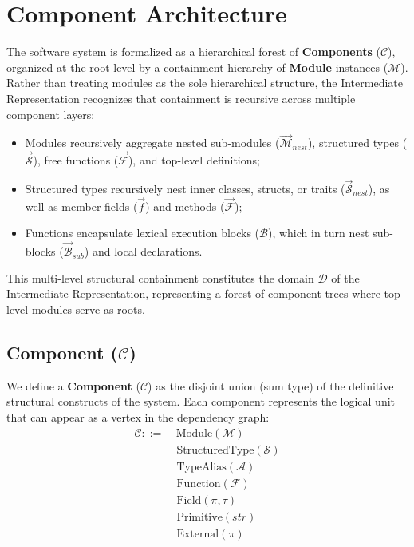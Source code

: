 \section{Component Architecture}
The software system is formalized as a hierarchical forest of
\textbf{Components} ($\mathcal{C}$), organized at the root level by a
containment hierarchy of \textbf{Module} instances ($\mathcal{M}$).
Rather than treating modules as the sole hierarchical structure, the
Intermediate Representation recognizes that containment is recursive
across multiple component layers:
\begin{itemize}
  \item Modules recursively aggregate nested sub-modules
    ($\vec{\mathcal{M}}_{nest}$),
    structured types ($\vec{\mathcal{S}}$), free functions
    ($\vec{\mathcal{F}}$),
    and top-level definitions;
  \item Structured types recursively nest inner classes, structs, or traits
    ($\vec{\mathcal{S}}_{nest}$), as well as member fields
    ($\vec{f}$) and methods
    ($\vec{\mathcal{F}}$);
  \item Functions encapsulate lexical execution blocks ($\mathcal{B}$),
    which in turn nest sub-blocks ($\vec{\mathcal{B}}_{sub}$) and
    local declarations.
\end{itemize}
This multi-level structural containment constitutes the domain
$\mathcal{D}$ of the Intermediate Representation, representing a forest of
component trees where top-level modules serve as roots.

\subsection{Component ($\mathcal{C}$)}
We define a \textbf{Component} ($\mathcal{C}$) as the disjoint union
(sum type) of the definitive structural constructs of the system.
Each component represents the logical unit that can appear as a
vertex in the dependency graph:
\begin{align*}
  \mathcal{C} ::=&\ \text{Module}(\mathcal{M}) \\
  &\mid \text{StructuredType}(\mathcal{S}) \\
  &\mid \text{TypeAlias}(\mathcal{A}) \\
  &\mid \text{Function}(\mathcal{F}) \\
  &\mid \text{Field}(\pi, \tau) \\
  &\mid \text{Primitive}(str) \\
  &\mid \text{External}(\pi)
\end{align*}

